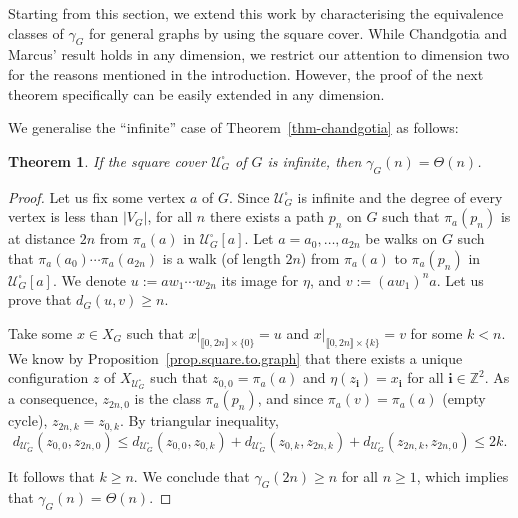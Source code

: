 \documentclass{article}
\newtheorem{theorem}{Theorem}[section]
\newcommand\quadcover[1]{\mathcal{U}^\square_{#1}}
\begin{document}
Starting from this section, we extend this work by characterising the equivalence classes of $\gamma_G$ for general graphs by using the square cover. While Chandgotia and Marcus' result holds in any dimension, we restrict our attention to dimension two for the reasons mentioned in the introduction.  However, the proof of the next theorem specifically can be easily extended in any dimension.

We generalise the ``infinite'' case of Theorem~\ref{thm-chandgotia} as follows:

\begin{theorem}\label{thm:main1}
If the square cover $\quadcover{G}$ of $G$ is infinite, then $\gamma_G(n) = \Theta(n)$. 
\end{theorem}

\begin{proof}
Let us fix some vertex $a$ of $G$.
Since $\quadcover{G}$ is infinite and the degree of every vertex is less than $|V_G|$, for all $n$ there exists a path $p_n$ on $G$ such that $\pi_a(p_n)$ is at distance $2n$ from $\pi_a(a)$ in $\quadcover{G}[a]$. Let $a = a_0, \ldots , a_{2n}$ be walks on $G$ such that $\pi_a (a_0) \cdots \pi_a (a_{2n})$ is a walk (of length $2n$) from $\pi_a(a)$ to $\pi_a(p_n)$ in $\quadcover{G}[a]$. We denote $u := a w_1 \cdots w_{2n}$ its image for $\eta$, and $v:= (a w_1)^{n} a$. Let us prove that $d_{G} (u,v)\geq n$. 

Take some $x \in X_G$ such that $x|_{\llbracket 0, 2n \rrbracket \times \{0\}} = u$ and $x|_{\llbracket 0, 2n \rrbracket \times \{k\}} = v$ for some $k<n$. We know by Proposition~\ref{prop.square.to.graph} that there exists a unique configuration $z$ of $X_{\quadcover{G}}$ such that $z_{0,0} %
= \pi_a (a)$ and $\eta(z_{\textbf{i}}) = x_{\textbf{i}}$ for all $\textbf{i} \in \mathbb{Z}^2$. As a consequence, $z_{2n,0}$ is the class $\pi_a (p_n)$, and since $\pi_a (v)=\pi_a (a)$ (empty cycle), $z_{2n,k} = z_{0,k}$. By triangular inequality, 
\[d_{\quadcover{G}} (z_{0,0}, z_{2n,0}) \leq d_{\quadcover{G}} (z_{0,0}, z_{0,k}) + d_{\quadcover{G}} (z_{0,k}, z_{2n,k}) + d_{\quadcover{G}} (z_{2n,k}, z_{2n,0}) \leq 2k.\] 

It follows that $k \geq n$. We conclude that $\gamma_G(2n) \ge n$ for all $n \ge 1$, which implies that 
$\gamma_G(n) = \Theta(n)$.
\end{proof}
\end{document}
